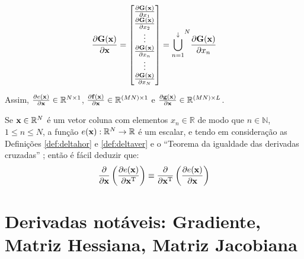 \begin{definition}
\begin{equation}
\frac{\partial \MATRIX{G}(\VECTOR{x}) }{\partial \VECTOR{x}}= 
\left[
\begin{matrix}
\frac{\partial \MATRIX{G}(\VECTOR{x}) }{\partial x_{1}} \\
\frac{\partial \MATRIX{G}(\VECTOR{x}) }{\partial x_{2}} \\
\vdots \\
\frac{\partial \MATRIX{G}(\VECTOR{x}) }{\partial x_{n}} \\
\vdots \\
\frac{\partial \MATRIX{G}(\VECTOR{x}) }{\partial x_{N}}
\end{matrix}
\right] = {\bigcup\limits_{n=1}^{\downarrow}}^{N}{\frac{\partial \MATRIX{G}(\VECTOR{x}) }{\partial x_{n}}}
\end{equation}

Assim, 
$\frac{\partial e(\VECTOR{x}) }{\partial \VECTOR{x}} \in \mathbb{R}^{N \times 1}$,
$\frac{\partial \VECTOR{f}(\VECTOR{x}) }{\partial \VECTOR{x}} \in \mathbb{R}^{(MN) \times 1}$ e
$\frac{\partial \VECTOR{g}(\VECTOR{x}) }{\partial \VECTOR{x}} \in \mathbb{R}^{(MN) \times L}$.
\end{definition}


\begin{corollary}\label{cor:derder}
Se 
$\VECTOR{x}\in \mathbb{R}^N$ é um vetor coluna com elementos $x_n\in \mathbb{R}$ de modo que
$n\in \mathbb{N}$, $1 \leq n \leq N$, 
a função $e(\VECTOR{x}): \mathbb{R}^N \rightarrow \mathbb{R}$ é um escalar,
e tendo em consideração as Definições \ref{def:deltahor} e \ref {def:deltaver} e o 
``Teorema da igualdade das derivadas cruzadas'' \FALTAREFERENCIA; então é fácil deduzir que:
\begin{equation}
 \frac{\partial }{\partial \VECTOR{x}} \left( \frac{\partial e(\VECTOR{x} )}{\partial \VECTOR{x}^{\transpose}} \right) \equiv \frac{\partial }{\partial \VECTOR{x}^{\transpose}} \left( \frac{\partial e(\VECTOR{x} )}{\partial \VECTOR{x}} \right)
\end{equation}
\end{corollary}

\section{Derivadas notáveis: Gradiente, Matriz Hessiana, Matriz Jacobiana}

